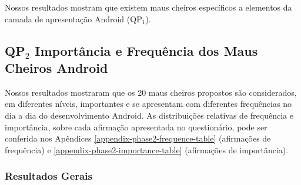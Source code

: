 

\begin{square}
  \small
  Nossos resultados mostram que existem maus cheiros específicos a elementos da camada de apresentação Android (QP$_1$).
\end{square}














\subsection{QP$_2$ Importância e Frequência dos Maus Cheiros Android}
\label{phase2-results}


Nossos resultados mostraram que os 20 maus cheiros propostos são considerados, em diferentes níveis, importantes e se apresentam com diferentes frequências no dia a dia do desenvolvimento Android. As distribuições relativas de frequência e importância, sobre cada afirmação apresentada no questionário, pode ser conferida nos Apêndices \ref{appendix-phase2-frequence-table} (afirmações de frequência) e \ref{appendix-phase2-importance-table} (afirmações de importância).


\subsubsection{Resultados Gerais}
\label{phase2-general-results}

